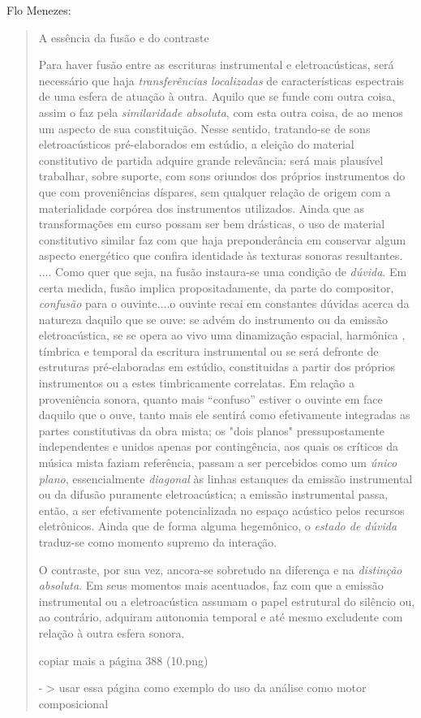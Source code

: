 \documentclass{ppgmus}
\begin{document}
Flo Menezes:

\begin{quotation}

A essência da fusão e do contraste

Para haver fusão entre as escrituras instrumental e eletroacústicas,
será necessário que haja \textit{transferências localizadas} de 
características espectrais de uma esfera de atuação à outra.
Aquilo que se funde com outra coisa, assim o faz pela \textit{similaridade
absoluta}, com esta outra coisa, de ao menos um aspecto de sua 
constituição. Nesse sentido, tratando-se de sons eletroacústicos 
pré-elaborados em estúdio, a eleição do material constitutivo de partida
adquire grande relevância: será mais plausível trabalhar, sobre suporte,
com sons oriundos dos próprios instrumentos do que com proveniências
díspares, sem qualquer relação de origem com a materialidade corpórea
dos instrumentos utilizados. Ainda que as transformações em curso possam ser
bem drásticas, o uso de material constitutivo similar faz com que
haja preponderância em conservar algum aspecto energético que confira
identidade às texturas sonoras resultantes.
....
Como quer que seja, na fusão instaura-se uma condição de \textit{dúvida}.
Em certa medida, fusão implica propositadamente, da parte do compositor,
\textit{confusão} para o ouvinte....o ouvinte recai em constantes dúvidas
acerca da natureza daquilo que se ouve: se advém do instrumento ou da 
emissão eletroacústica, se se opera ao vivo uma dinamização espacial, harmônica
, tímbrica e temporal da escritura instrumental ou se será defronte de
estruturas pré-elaboradas em estúdio, constituidas a partir dos próprios
instrumentos ou a estes timbricamente correlatas. Em relação a proveniência
sonora, quanto mais ``confuso'' estiver o ouvinte em face daquilo que
o ouve, tanto mais ele sentirá como efetivamente integradas as partes
constitutivas da obra mista; os "dois planos" pressupostamente independentes
e unidos apenas por contingência, aos quais os críticos da música mista
faziam referência, passam a ser percebidos como um \textit{único plano},
essencialmente \textit{diagonal} às linhas estanques da emissão instrumental
ou da difusão puramente eletroacústica; a emissão instrumental passa,
então, a ser efetivamente potencializada no espaço acústico pelos recursos 
eletrônicos. Ainda que de forma alguma hegemônico, o \textit{estado de
dúvida} traduz-se como momento supremo da interação.

O contraste, por sua vez, ancora-se sobretudo na diferença e na 
\textit{distinção absoluta}. Em seus momentos mais acentuados, faz com
que a emissão instrumental ou a eletroacústica assumam o papel estrutural
do silêncio ou, ao contrário, adquiram autonomia temporal e até mesmo
excludente com relação à outra esfera sonora.


copiar mais a página 388 (10.png)

- > usar essa página como exemplo do uso da análise como motor 
composicional

\end{quotation}
\end{document}
